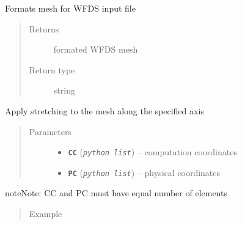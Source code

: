 \documentclass[letterpaper,10pt,english]{sphinxmanual}
\begin{document}
\begin{fulllineitems}
\begin{fulllineitems}
\label{wfds_Mesh:wfds.Mesh.format_mesh}
Formats mesh for WFDS input file
\begin{quote}\begin{description}
\item[{Returns}] \leavevmode
formated WFDS mesh

\item[{Return type}] \leavevmode
string

\end{description}\end{quote}

\end{fulllineitems}


\begin{fulllineitems}
\label{wfds_Mesh:wfds.Mesh.stretch_mesh}
Apply stretching to the mesh along the specified axis
\begin{quote}\begin{description}
\item[{Parameters}] \leavevmode\begin{itemize}
\item {} 
\textbf{\texttt{CC}} (\emph{\texttt{python list}}) -- computation coordinates

\item {} 
\textbf{\texttt{PC}} (\emph{\texttt{python list}}) -- physical coordinates

\end{itemize}

\end{description}\end{quote}

\begin{notice}{note}{Note:}
CC and PC must have equal number of elements
\end{notice}
\begin{quote}\begin{description}
\item[{Example}] \leavevmode
\end{description}\end{quote}


\end{fulllineitems}
\end{fulllineitems}
\end{document}
